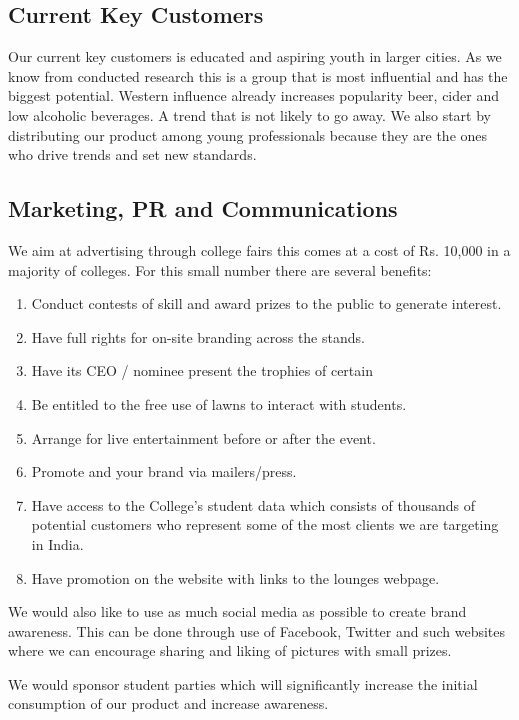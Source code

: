 \documentclass[11pt]{article}
\begin{document}
  \subsection{Current Key Customers}
Our current key customers is educated and aspiring youth in larger cities. As we
know from conducted research this is a group that is most influential and has
the biggest potential. Western influence already increases popularity beer,
cider and low alcoholic beverages. A trend that is not likely to go away. We
also start by distributing our product among young professionals because they
are the ones who drive trends and set new standards.

  \subsection{Marketing, PR and Communications}
We aim at advertising through college fairs this comes at a cost of Rs. 10,000
in a majority of colleges. For this small number there are several benefits:

\begin{enumerate}
\item Conduct contests of skill and award prizes to the public to generate
interest.
\item Have full rights for on-site branding across the stands.
\item Have its CEO / nominee present the trophies of certain
\item Be entitled to the free use of lawns to interact with students.
\item Arrange for live entertainment before or after the event.
\item Promote and your brand via mailers/press.
\item Have access to the College's student data which consists of thousands of
potential customers who represent some of the most clients we are targeting in
India.
\item Have promotion on the website with links to the lounges webpage.
\end{enumerate}

We would also like to use as much social media as possible to create brand
awareness. This can be done through use of Facebook, Twitter and such websites
where we can encourage sharing and liking  of pictures with small prizes.

We would sponsor student parties which will significantly increase the initial
consumption of our product and increase awareness.
\end{document}

